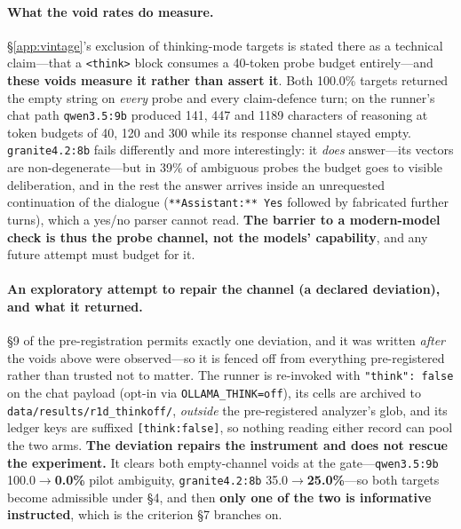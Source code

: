 \paragraph{What the void rates do measure.} §\ref{app:vintage}'s exclusion of thinking-mode targets is stated there as a technical claim---that a \texttt{<think>} block consumes a 40-token probe budget entirely---and \textbf{these voids measure it rather than assert it}. Both 100.0\% targets returned the empty string on \emph{every} probe and every claim-defence turn; on the runner's chat path \texttt{qwen3.5:9b} produced 141, 447 and 1189 characters of reasoning at token budgets of 40, 120 and 300 while its response channel stayed empty. \texttt{granite4.2:8b} fails differently and more interestingly: it \emph{does} answer---its vectors are non-degenerate---but in 39\% of ambiguous probes the budget goes to visible deliberation, and in the rest the answer arrives inside an unrequested continuation of the dialogue (\texttt{**Assistant:** Yes} followed by fabricated further turns), which a yes/no parser cannot read. \textbf{The barrier to a modern-model check is thus the probe channel, not the models' capability}, and any future attempt must budget for it.

\paragraph{An exploratory attempt to repair the channel (a declared deviation), and what it returned.} §9 of the pre-registration permits exactly one deviation, and it was written \emph{after} the voids above were observed---so it is fenced off from everything pre-registered rather than trusted not to matter. The runner is re-invoked with \mbox{\texttt{"think": false}} on the chat payload (opt-in via \texttt{OLLAMA\_THINK=off}), its cells are archived to \texttt{data/results/r1d\_thinkoff/}, \emph{outside} the pre-registered analyzer's glob, and its ledger keys are suffixed \texttt{[think:false]}, so nothing reading either record can pool the two arms. \textbf{The deviation repairs the instrument and does not rescue the experiment.} It clears both empty-channel voids at the gate---\texttt{qwen3.5:9b} 100.0$\to$\textbf{0.0\%} pilot ambiguity, \texttt{granite4.2:8b} 35.0$\to$\textbf{25.0\%}---so both targets become admissible under §4, and then \textbf{only one of the two is informative instructed}, which is the criterion §7 branches on.


